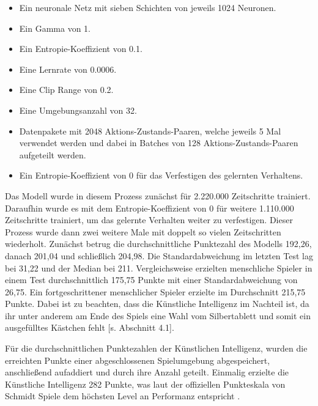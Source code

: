 \begin{itemize} 
\item Ein neuronale Netz mit sieben Schichten von jeweils 1024 Neuronen. 

\item Ein Gamma von 1. 

\item Ein Entropie-Koeffizient von 0.1. 

\item Eine Lernrate von 0.0006. 

\item Eine Clip Range von 0.2. 

\item Eine Umgebungsanzahl von 32. 

\item Datenpakete mit 2048 Aktions-Zustands-Paaren, welche jeweils 5 Mal verwendet werden und dabei in Batches von 128 Aktions-Zustands-Paaren aufgeteilt werden. 

\item Ein Entropie-Koeffizient von 0 für das Verfestigen des gelernten Verhaltens. 
\end{itemize} 

Das Modell wurde in diesem Prozess zunächst für 2.220.000 Zeitschritte trainiert. Daraufhin wurde es mit dem Entropie-Koeffizient von 0 für weitere 1.110.000 Zeitschritte trainiert, um das gelernte Verhalten weiter zu verfestigen. Dieser Prozess wurde dann zwei weitere Male mit doppelt so vielen Zeitschritten wiederholt. Zunächst betrug die durchschnittliche Punktezahl des Modells 192,26, danach 201,04 und schließlich 204,98. Die Standardabweichung im letzten Test lag bei 31,22 und der Median bei 211. Vergleichsweise erzielten menschliche Spieler in einem Test durchschnittlich 175,75 Punkte mit einer Standardabweichung von 26,75. Ein fortgeschrittener menschlicher Spieler erzielte im Durchschnitt 215,75 Punkte. Dabei ist zu beachten, dass die Künstliche Intelligenz im Nachteil ist, da ihr unter anderem am Ende des Spiels eine Wahl vom Silbertablett und somit ein ausgefülltes Kästchen fehlt [s. Abschnitt 4.1].

Für die durchschnittlichen Punktezahlen der Künstlichen Intelligenz, wurden die erreichten Punkte einer abgeschlossenen Spielumgebung abgespeichert, anschließend aufaddiert und durch ihre Anzahl geteilt. Einmalig erzielte die Künstliche Intelligenz 282 Punkte, was laut der offiziellen Punkteskala von Schmidt Spiele dem höchsten Level an Performanz entspricht \cite{schmidtspiele_ganzschonclever}.
